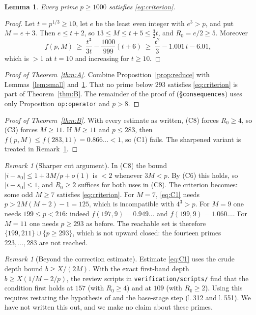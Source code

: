 \documentclass[11pt]{amsart}
\numberwithin{equation}{section}
\newtheorem{lemma}[theorem]{Lemma}
\theoremstyle{definition}
\theoremstyle{remark}
\newtheorem{remark}[theorem]{Remark}
\newcommand{\up}[1]{\texttt{#1}}
\begin{document}
\begin{lemma}\label{lem:tail}
Every prime $p\ge1000$ satisfies \eqref{eq:criterion}.
\end{lemma}

\begin{proof}
Let $t=p^{1/3}\ge10$, let $e$ be the least even integer with $e^3>p$,
and put $M=e+3$. Then $e\le t+2$, so $13\le M\le t+5\le\frac32t$,
and $R_0=e/2\ge5$. Moreover
\[
 f(p,M)\ \ge\ \frac{t^3}{3t}-\frac{1000}{999}(t+6)
 \ \ge\ \frac{t^2}{3}-1.001\,t-6.01,
\]
which is $>1$ at $t=10$ and increasing for $t\ge10$.
\end{proof}

\begin{proof}[Proof of Theorem~\ref{thm:A}]
Combine Proposition~\ref{prop:reduce} with
Lemmas~\ref{lem:small} and~\ref{lem:tail}. That no prime below $293$
satisfies \eqref{eq:criterion} is part of Theorem~\ref{thm:B}. The
remainder of the proof of \cite[Theorem~1.1]{OAI-HW2}
(\S\up{consequences}) uses only Proposition~\up{op:operator} and
$p>8$.
\end{proof}

\begin{proof}[Proof of Theorem~\ref{thm:B}]
With every estimate as written, (C8) forces $R_0\ge4$, so (C3) forces
$M\ge11$. If $M\ge11$ and $p\le283$, then
$f(p,M)\le f(283,11)=0.866\ldots<1$, so (C1) fails. The sharpened
variant is treated in Remark~\ref{rem:sharp}.
\end{proof}

\begin{remark}[Sharper cut argument]\label{rem:sharp}
In (C8) the bound $|i-s_0|\le1+3M/p+o(1)$ is $<2$ whenever $3M<p$. By
(C6) this holds, so $|i-s_0|\le1$, and $R_0\ge2$ suffices for both
uses in (C8). The criterion becomes: some odd $M\ge7$ satisfies
\eqref{eq:criterion}. For $M=7$, \eqref{eq:C1} needs
$p>2M(M+2)-1=125$, which is incompatible with $4^3>p$. For $M=9$ one
needs $199\le p<216$: indeed $f(197,9)=0.949\ldots$ and
$f(199,9)=1.060\ldots$. For $M=11$ one needs $p\ge293$ as before. The
reachable set is therefore $\{199,211\}\cup\{p\ge293\}$, which is not
upward closed: the fourteen primes $223,\ldots,283$ are not reached.
\end{remark}

\begin{remark}[Beyond the correction estimate]\label{rem:C1v}
Estimate \eqref{eq:C1} uses the crude depth bound $b\ge X/(2M)$. With
the exact first-band depth $b\ge X(1/M-2/p)$, the review scripts in
\up{verification/scripts/} find that the condition first holds at
$157$ (with $R_0\ge4$) and at $109$ (with $R_0\ge2$). Using this
requires restating the hypothesis of
\cite[Lemma~\up{op:coefficient-control}]{OAI-HW2} and the base-stage
step (l.\,312 and l.\,551). We have not written this out, and we make
no claim about these primes.
\end{remark}
\end{document}
